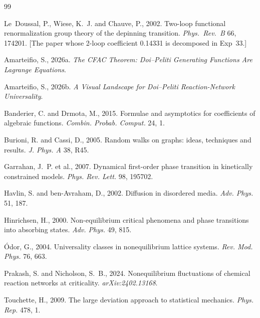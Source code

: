 \documentclass[11pt,a4paper]{article}
\theoremstyle{plain}
\begin{document}
\begin{thebibliography}{99}

Le~Doussal, P., Wiese, K.~J. and Chauve, P., 2002.
Two-loop functional renormalization group theory of the depinning
transition. \textit{Phys.\ Rev.\ B} 66, 174201.
[The paper whose 2-loop coefficient 0.14331 is decomposed in Exp~33.]

Amarteifio, S., 2026a. \textit{The CFAC Theorem: Doi--Peliti Generating
Functions Are Lagrange Equations}.

Amarteifio, S., 2026b. \textit{A Visual Landscape for Doi--Peliti
Reaction-Network Universality}.

Banderier, C. and Drmota, M., 2015. Formulae and asymptotics for
coefficients of algebraic functions. \textit{Combin. Probab. Comput.}
24, 1.

Burioni, R. and Cassi, D., 2005. Random walks on graphs: ideas, techniques
and results. \textit{J. Phys. A} 38, R45.

Garrahan, J.~P. et al., 2007. Dynamical first-order phase transition in
kinetically constrained models. \textit{Phys. Rev. Lett.} 98, 195702.

Havlin, S. and ben-Avraham, D., 2002. Diffusion in disordered media.
\textit{Adv. Phys.} 51, 187.

Hinrichsen, H., 2000. Non-equilibrium critical phenomena and phase
transitions into absorbing states. \textit{Adv. Phys.} 49, 815.

\'Odor, G., 2004. Universality classes in nonequilibrium lattice
systems. \textit{Rev. Mod. Phys.} 76, 663.

Prakash, S. and Nicholson, S.~B., 2024. Nonequilibrium fluctuations of
chemical reaction networks at criticality. \textit{arXiv:2402.13168}.

Touchette, H., 2009. The large deviation approach to statistical
mechanics. \textit{Phys. Rep.} 478, 1.

\end{thebibliography}
\end{document}
